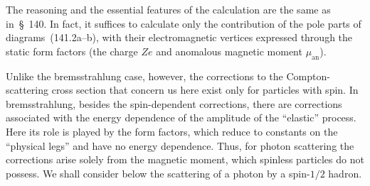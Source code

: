 The reasoning and the essential features of the calculation are the same as in~\S~140. In fact, it suffices to calculate only the contribution of the pole parts of diagrams~(141.2a--b), with their electromagnetic vertices expressed through the static form factors (the charge $Ze$ and anomalous magnetic moment $\mu_{\text{an}}$).

Unlike the bremsstrahlung case, however, the corrections to the Compton-scattering cross section that concern us here exist only for particles with spin. In bremsstrahlung, besides the spin-dependent corrections, there are corrections associated with the energy dependence of the amplitude of the ``elastic'' process. Here its role is played by the form factors, which reduce to constants on the ``physical legs'' and have no energy dependence. Thus, for photon scattering the corrections arise solely from the magnetic moment, which spinless particles do not possess. We shall consider below the scattering of a photon by a spin-$1/2$ hadron.

